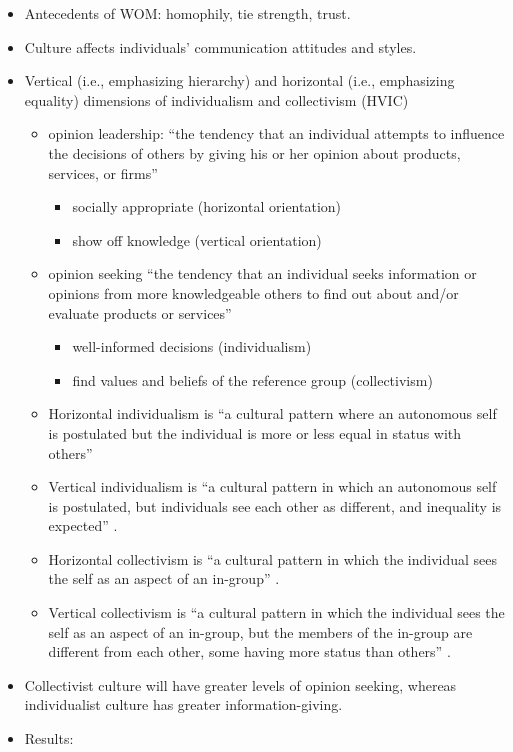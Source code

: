 \documentclass[
]{book}
\begin{document}
\begin{itemize}
\item
  Antecedents of WOM: homophily, tie strength, trust.
\item
  Culture affects individuals' communication attitudes and styles.
\item
  Vertical (i.e., emphasizing hierarchy) and horizontal (i.e., emphasizing equality) dimensions of individualism and collectivism (HVIC) \citep{singelis1995}

  \begin{itemize}
  \item
    opinion leadership: ``the tendency that an individual attempts to influence the decisions of others by giving his or her opinion about products, services, or firms'' \citep[pp.~294]{choi2019}

    \begin{itemize}
    \item
      socially appropriate (horizontal orientation)
    \item
      show off knowledge (vertical orientation)
    \end{itemize}
  \item
    opinion seeking ``the tendency that an individual seeks information or opinions from more knowledgeable others to find out about and/or evaluate products or services'' \citep[pp.~294]{choi2019}

    \begin{itemize}
    \item
      well-informed decisions (individualism)
    \item
      find values and beliefs of the reference group (collectivism)
    \end{itemize}
  \item
    Horizontal individualism is ``a cultural pattern where an autonomous self is postulated but the individual is more or less equal in status with others'' \citep[pp.~245]{singelis1995}
  \item
    Vertical individualism is ``a cultural pattern in which an autonomous self is postulated, but individuals see each other as different, and inequality is expected'' \citep[pp.~245]{singelis1995}.
  \item
    Horizontal collectivism is ``a cultural pattern in which the individual sees the self as an aspect of an in-group'' \citep[pp.~244]{singelis1995}.
  \item
    Vertical collectivism is ``a cultural pattern in which the individual sees the self as an aspect of an in-group, but the members of the in-group are different from each other, some having more status than others'' \citep[pp.~244]{singelis1995}.
  \end{itemize}
\item
  Collectivist culture will have greater levels of opinion seeking, whereas individualist culture has greater information-giving.\citep{fong2008}
\item
  Results:


\end{itemize}
\end{document}

